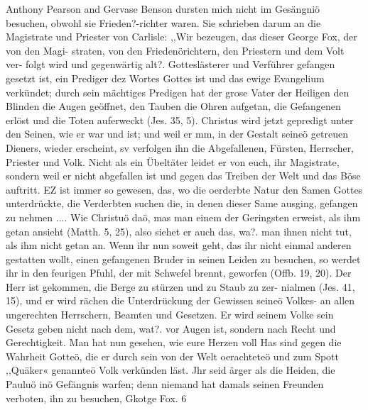 Anthony Pearson and Gervase Benson dursten mich nicht im
Gesängniö besuchen, obwohl sie Frieden?-richter waren. Sie
schrieben darum an die Magistrate und Priester von Carlisle:
,,Wir bezeugen, das dieser George Fox, der von den Magi-
straten, von den Friedenörichtern, den Priestern und dem Volt ver-
folgt wird und gegenwärtig alt?. Gotteslästerer und Verführer
gefangen gesetzt ist, ein Prediger dez Wortes Gottes ist und das
ewige Evangelium verkündet; durch sein mächtiges Predigen hat
der grose Vater der Heiligen den Blinden die Augen geöffnet,
den Tauben die Ohren aufgetan, die Gefangenen erlöst und die
Toten auferweckt (Jes. 35, 5). Christus wird jetzt gepredigt unter
den Seinen, wie er war und ist; und weil er mm, in der Gestalt
seineö getreuen Dieners, wieder erscheint, sv verfolgen ihn die
Abgefallenen, Fürsten, Herrscher, Priester und Volk. Nicht als
ein Übeltäter leidet er von euch, ihr Magistrate, sondern weil er
nicht abgefallen ist und gegen das Treiben der Welt und das
Böse auftritt. EZ ist immer so gewesen, das, wo die oerderbte
Natur den Samen Gottes unterdrückte, die Verderbten suchen die,
in denen dieser Same ausging, gefangen zu nehmen .... Wie
Christuö daö, mas man einem der Geringsten erweist, als ihm
getan ansieht (Matth. 5, 25), also siehet er auch das, wa?. man
ihnen nicht tut, als ihm nicht getan an. Wenn ihr nun soweit
geht, das ihr nicht einmal anderen gestatten wollt, einen gefangenen
Bruder in seinen Leiden zu besuchen, so werdet ihr in den feurigen
Pfuhl, der mit Schwefel brennt, geworfen (Offb. 19, 20). Der
Herr ist gekommen, die Berge zu stürzen und zu Staub zu zer-
nialmen (Jes. 41, 15), und er wird rächen die Unterdrückung der
Gewissen seineö Volkes- an allen ungerechten Herrschern, Beamten
und Gesetzen. Er wird seinem Volke sein Gesetz geben nicht nach
dem, wat?. vor Augen ist, sondern nach Recht und Gerechtigkeit.
Man hat nun gesehen, wie eure Herzen voll Has sind gegen die
Wahrheit Gotteö, die er durch sein von der Welt oerachteteö und
zum Spott ,,Quäker« genannteö Volk verkünden läst. Jhr seid
ärger als die Heiden, die Pauluö inö Gefängnis warfen; denn
niemand hat damals seinen Freunden verboten, ihn zu besuchen,
Gkotge Fox. 6


